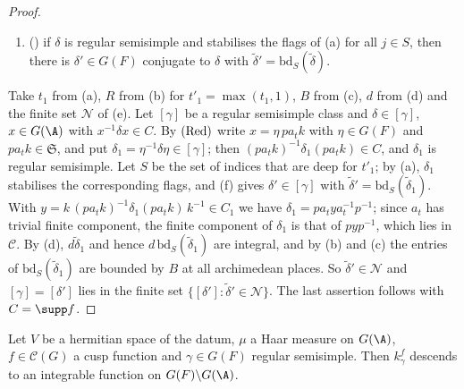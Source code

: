 \begin{proof}
\begin{enumerate}[label=(\alph*)]
all archimedean absolute values of the entries at most $B$ is finite;
\item () if $\delta$ is regular semisimple and stabilises the
flags of (a) for all $j\in S$, then there is $\delta'\in G(F)$ conjugate to $\delta$ with $\tilde\delta'=
\mathrm{bd}_S(\tilde\delta)$.
\end{enumerate}
Take $t_1$ from (a), $R$ from (b) for $t'_1=\max(t_1,1)$, $B$ from (c), $d$ from (d) and the finite set $\mathcal N$ of (e).
Let $[\gamma]$ be a regular semisimple class and $\delta\in[\gamma]$, $x\in G(\A)$ with $x^{-1}\delta x\in C$. By
$\textup{(Red)}$ write $x=\eta\,pa_tk$ with $\eta\in G(F)$ and $pa_tk\in\mathfrak S$, and put $\delta_1=\eta^{-1}\delta\eta
\in[\gamma]$; then $(pa_tk)^{-1}\delta_1(pa_tk)\in C$, and $\delta_1$ is regular semisimple. Let $S$ be the set of indices
that are deep for $t'_1$; by (a), $\delta_1$ stabilises the corresponding flags, and (f) gives $\delta'\in[\gamma]$ with
$\tilde\delta'=\mathrm{bd}_S(\tilde\delta_1)$. With $y=k\,(pa_tk)^{-1}\delta_1(pa_tk)\,k^{-1}\in C_1$ we have
$\delta_1=pa_tya_t^{-1}p^{-1}$; since $a_t$ has trivial finite component, the finite component of $\delta_1$ is that of
$pyp^{-1}$, which lies in $\mathcal C$. By (d), $d\tilde\delta_1$ and hence $d\,\mathrm{bd}_S(\tilde\delta_1)$ are integral,
and by (b) and (c) the entries of $\mathrm{bd}_S(\tilde\delta_1)$ are bounded by $B$ at all archimedean places. So
$\tilde\delta'\in\mathcal N$ and $[\gamma]=[\delta']$ lies in the finite set $\{[\delta']:\tilde\delta'\in\mathcal N\}$. The
last assertion follows with $C=\supp f$.
\end{proof}

\begin{lemma}\label{pf:multnc:regint}
Let $V$ be a hermitian space of the datum, $\mu$ a Haar measure on $G(\A)$, $f\in\mathcal C(G)$ a cusp function and
$\gamma\in G(F)$ regular semisimple. Then $k^f_\gamma$ descends to an integrable function on $G(F)\backslash G(\A)$.
\end{lemma}

